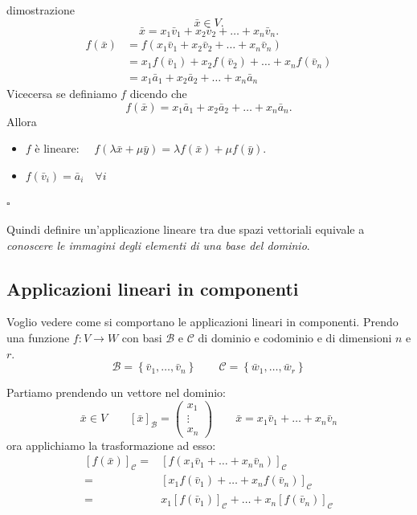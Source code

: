 \documentclass[x11names]{article}
\newcommand*{\QEDB}{\null\nobreak\hfill\ensuremath{\square}}%
\begin{document}
\begin{es}{dimostrazione}
\[
\bar{x} \in V
.\] 
\[
\bar{x} = x_1 \bar{v}_{1} + x_2\bar{v}_{2} + \dots + x_{n}\bar{v}_{n}
.\] 
\begin{align*}
	f\left(\bar{x}\right) &= f\left(x_1 \bar{v}_{1} + x_2\bar{v}_{2} + \dots + x_{n}\bar{v}_{n}\right) \\
				   &= x_1 f\left(\bar{v}_{1}\right) + x_2 f\left(\bar{v}_{2}\right) + \dots + x_{n}f\left(\bar{v}_{n}\right) \\
				   &= x_1 \bar{a}_{1} + x_2 \bar{a}_{2} + \dots + x_{n} \bar{a}_{n}
\end{align*}
Vicecersa se definiamo $f$ dicendo che 
\[
f\left(\bar{x}\right) = x_1 \bar{a}_{1} + x_2 \bar{a}_{2} + \dots + x_{n} \bar{a}_{n}
.\] 
Allora
\begin{itemize}
	\item $f$ è lineare: $\quad f\left(\lambda \bar{x} + \mu \bar{y}\right) = \lambda f\left(\bar{x}\right) + \mu f\left(\bar{y}\right)$.
	\item $f\left(\bar{v}_{i}\right) = \bar{a}_{i} \quad \forall i$
\end{itemize} \QEDB
\end{es}


Quindi definire un'applicazione lineare tra due spazi vettoriali equivale a \textit{conoscere le immagini degli elementi di una base del dominio}.

\subsection{Applicazioni lineari in componenti}
Voglio vedere come si comportano le applicazioni lineari in componenti. Prendo una funzione $f: V \to W$ con basi $\mathcal{B}$ e $\mathcal{C}$ di dominio e codominio e di dimensioni $n$ e $r$. 
\[
\mathcal{B} = \left\{\bar{v}_{1}, \dots, \bar{v}_{n}\right\} \qquad \mathcal{C} = \left\{\bar{w}_{1},\dots,\bar{w}_{r}\right\}
\]

\noindent
Partiamo prendendo un vettore nel dominio:
\[
\bar{x} \in V \qquad \left[\bar{x}\right]_{\mathcal{B}} = \left(\begin{array}{c}
	x_{1} \\
	\vdots \\
	x_{n}
\end{array}\right) \qquad \bar{x} = x_{1}\bar{v}_{1} + \dots + x_{n}\bar{v}_{n}
\]
ora applichiamo la trasformazione ad esso:
\begin{align*}
	\left[f(\bar{x})\right]_{\mathcal{C}} =& \left[f(x_{1}\bar{v}_{1} + \dots + x_{n}\bar{v}_{n})\right]_{\mathcal{C}}	\\
							=& \left[x_{1}f(\bar{v}_{1}) + \dots + x_{n}f(\bar{v}_{n})\right]_{\mathcal{C}} \\
							=& x_{1}\left[f(\bar{v}_{1})\right]_{\mathcal{C}} + \dots + x_{n}\left[f(\bar{v}_{n})\right]_{\mathcal{C}}
\end{align*}
\end{document}
